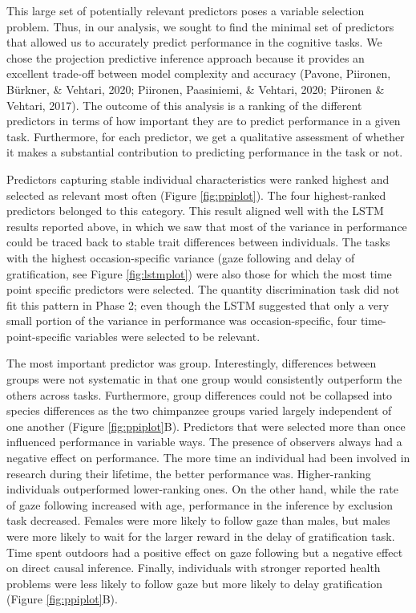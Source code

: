 \documentclass[
  man,floatsintext]{apa6}
\begin{document}
This large set of potentially relevant predictors poses a variable selection problem. Thus, in our analysis, we sought to find the minimal set of predictors that allowed us to accurately predict performance in the cognitive tasks. We chose the projection predictive inference approach because it provides an excellent trade-off between model complexity and accuracy (Pavone, Piironen, Bürkner, \& Vehtari, 2020; Piironen, Paasiniemi, \& Vehtari, 2020; Piironen \& Vehtari, 2017). The outcome of this analysis is a ranking of the different predictors in terms of how important they are to predict performance in a given task. Furthermore, for each predictor, we get a qualitative assessment of whether it makes a substantial contribution to predicting performance in the task or not.

Predictors capturing stable individual characteristics were ranked highest and selected as relevant most often (Figure \ref{fig:ppiplot}). The four highest-ranked predictors belonged to this category. This result aligned well with the LSTM results reported above, in which we saw that most of the variance in performance could be traced back to stable trait differences between individuals. The tasks with the highest occasion-specific variance (gaze following and delay of gratification, see Figure \ref{fig:lstmplot}) were also those for which the most time point specific predictors were selected. The quantity discrimination task did not fit this pattern in Phase 2; even though the LSTM suggested that only a very small portion of the variance in performance was occasion-specific, four time-point-specific variables were selected to be relevant.

The most important predictor was group. Interestingly, differences between groups were not systematic in that one group would consistently outperform the others across tasks. Furthermore, group differences could not be collapsed into species differences as the two chimpanzee groups varied largely independent of one another (Figure \ref{fig:ppiplot}B). Predictors that were selected more than once influenced performance in variable ways. The presence of observers always had a negative effect on performance. The more time an individual had been involved in research during their lifetime, the better performance was. Higher-ranking individuals outperformed lower-ranking ones. On the other hand, while the rate of gaze following increased with age, performance in the inference by exclusion task decreased. Females were more likely to follow gaze than males, but males were more likely to wait for the larger reward in the delay of gratification task. Time spent outdoors had a positive effect on gaze following but a negative effect on direct causal inference. Finally, individuals with stronger reported health problems were less likely to follow gaze but more likely to delay gratification (Figure \ref{fig:ppiplot}B).
\end{document}
